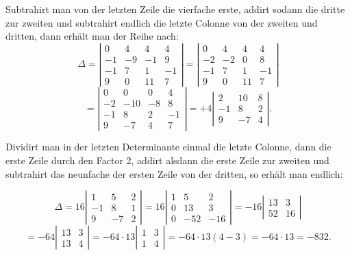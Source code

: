 Subtrahirt man von der letzten Zeile die vierfache erste, addirt sodann die dritte zur zweiten und subtrahirt endlich die letzte Colonne von der zweiten und dritten, dann erhält man der Reihe nach:
\[
\Delta =
\left|
\begin{array}{rrrr}
0 & 4 & 4 & 4 \\
-1 & -9 & -1 & 9 \\
-1 & 7 & 1 & -1 \\
9 & 0 & 11 & 7
\end{array}
\right|
=
\left|
\begin{array}{rrrr}
0 & 4 & 4 & 4 \\
-2 & -2 & 0 & 8 \\
-1 & 7 & 1 & -1 \\
9 & 0 & 11 & 7
\end{array}
\right|
\]
\[
=
\left|
\begin{array}{rrrr}
0 & 0 & 0 & 4 \\
-2 & -10 & -8 & 8 \\
-1 & 8 & 2 & -1 \\
9 & -7 & 4 & 7
\end{array}
\right|
= +4
\left|
\begin{array}{rrr}
2 & 10 & 8 \\
-1 & 8 & 2 \\
9 & -7 & 4
\end{array}
\right|.
\]

Dividirt man in der letzten Determinante einmal die letzte Colonne, dann die erste Zeile durch den Factor 2, addirt alsdann die erste Zeile zur zweiten und subtrahirt das neunfache der ersten Zeile von der dritten, so erhält man endlich:


\[
\Delta = 16
\left|
\begin{array}{rrr}
1 & 5 & 2 \\
-1 & 8 & 1 \\
9 & -7 & 2
\end{array}
\right|
= 16
\left|
\begin{array}{rrr}
1 & 5 & 2 \\
0 & 13 & 3 \\
0 & -52 & -16
\end{array}
\right|
= -16
\left|
\begin{array}{rr}
13 & 3 \\
52 & 16
\end{array}
\right|
\]
\[
= -64
\left|
\begin{array}{rr}
13 & 3 \\
13 & 4
\end{array}
\right|
= -64\cdot 13
\left|
\begin{array}{rr}
1 & 3 \\
1 & 4
\end{array}
\right|
= -64\cdot 13(4-3) = -64\cdot 13 = -832.
\]

